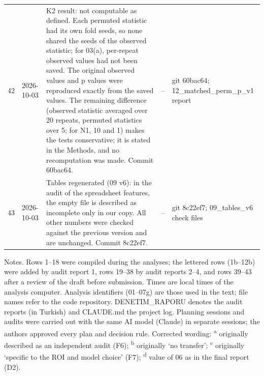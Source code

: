 \begin{longtable}{@{}p{0.6cm}p{1.9cm}p{6.8cm}p{2.8cm}p{2.3cm}@{}}
42 & \raggedright 2026-10-03 & K2 result: not computable as defined. Each permuted statistic had its own fold seeds, so none shared the seeds of the observed statistic; for 03(a), per-repeat observed values had not been saved. The original observed values and p values were reproduced exactly from the saved values. The remaining difference (observed statistic averaged over 20 repeats, permuted statistics over 5; for N1, 10 and 1) makes the tests conservative; it is stated in the Methods, and no recomputation was made. Commit 60bac64. & \raggedright -- & \raggedright git 60bac64; 12\_\allowbreak{}matched\_\allowbreak{}perm\_\allowbreak{}p\_\allowbreak{}v1 report \tabularnewline
43 & \raggedright 2026-10-03 & Tables regenerated (09 v6): in the audit of the spreadsheet features, the empty file is described as incomplete only in our copy. All other numbers were checked against the previous version and are unchanged. Commit 8c22ef7. & \raggedright -- & \raggedright git 8c22ef7; 09\_\allowbreak{}tables\_\allowbreak{}v6 check files \tabularnewline
\end{longtable}
\vspace{-0.5\baselineskip}
{\scriptsize\noindent Notes. Rows 1--18 were compiled during the analyses; the lettered rows (1b--12b) were added by audit report 1, rows 19--38 by audit reports 2--4, and rows 39--43 after a review of the draft before submission. Times are local times of the analysis computer. Analysis identifiers (01--07g) are those used in the text; file names refer to the code repository. DENETIM\_\allowbreak{}RAPORU denotes the audit reports (in Turkish) and CLAUDE.md the project log. Planning sessions and audits were carried out with the same AI model (Claude) in separate sessions; the authors approved every plan and decision rule. Corrected wording: \textsuperscript{a} originally described as an independent audit (F6); \textsuperscript{b} originally `no transfer'; \textsuperscript{c} originally `specific to the ROI and model choice' (F7); \textsuperscript{d} value of 06 as in the final report (D2).\par}
\endgroup
